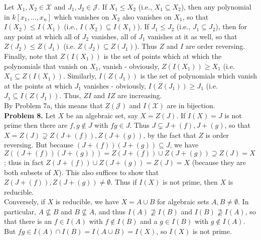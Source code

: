 \documentclass[11pt]{article}
\newcommand{\num}[1]{\noindent \textbf{#1}}
\theoremstyle{definition}
\begin{document}
Let $X_1,X_2\in\mathcal{X}$ and $J_1,J_2\in\mathcal{J}$. If $X_1\leq X_2$ (i.e., $X_1\subseteq X_2$), then any polynomial in $k[x_1,\ldots,x_n]$ which vanishes on $X_2$ also vanishes on $X_1$, so that $I(X_2)\leq I(X_1)$ (i.e., $I(X_2)\subseteq I(X_1)$). If $J_1\leq J_2$ (i.e., $J_1\subseteq J_2$), then for any point at which all of $J_2$ vanishes, all of $J_1$ vanishes at it as well, so that $Z(J_2)\leq Z(J_1)$ (i.e. $Z(J_2)\subseteq Z(J_1)$). Thus $Z$ and $I$ are order reversing. Finally, note that $Z(I(X_1))$ is the set of points which at which the polynomials that vanish on $X_1$, vanish - obviously, $Z(I(X_1))\geq X_1$ (i.e. $X_1\subseteq Z(I(X_1))$. Similarly, $I(Z(J_1))$ is the set of polynomials which vanish at the points at which $J_1$ vanishes - obviously, $I(Z(J_1))\geq J_1$ (i.e. $J_1\subseteq I(Z(J_1))$. Thus, $ZI$ and $IZ$ are increasing. \\

By Problem 7a, this means that $Z(\mathcal{J})$ and $I(\mathcal{X})$ are in bijection.\\

\num{Problem 8.} Let $X$ be an algebraic set, say $X=Z(J)$. If $I(X)=J$ is not prime then there are $f,g\notin J$ with $fg\in J$. Thus $J\subsetneq J+(f), J+(g)$, so that $X=Z(J)\supsetneq Z(J+(f)),Z(J+(g))$, by the fact that $Z$ is order reversing. But because $(J+(f))(J+(g))\subseteq J$, we have $Z((J+(f))(J+(g)))=Z(J+(f))\cup Z(J+(g))\supseteq Z(J)=X$; thus in fact $Z(J+(f))\cup Z(J+(g)) =Z(J)=X$ (because they are both subsets of $X$). This also suffices to show that $Z(J+(f)),Z(J+(g))\neq\emptyset$. Thus if $I(X)$ is not prime, then $X$ is reducible.\\

Conversely, if $X$ is reducible, we have $X=A\cup B$ for algebraic sets $A,B\neq\emptyset$. In particular, $A\not\subseteq B$ and $B\not\subseteq A$, and thus $I(A)\not\supseteq I(B)$ and $I(B)\not\supseteq I(A)$, so that there is an $f\in I(A)$ with $f\notin I(B)$ and a $g\in I(B)$ with $g\notin I(A)$. But $fg\in I(A)\cap I(B) = I(A\cup B)=I(X)$, so $I(X)$ is not prime.
\end{document}

